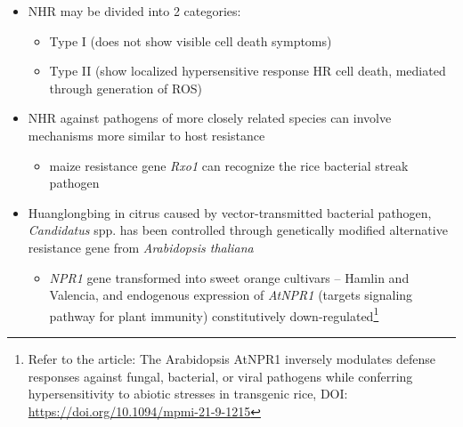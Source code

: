 \documentclass[11pt,dvipsnames,ignorenonframetext,aspectratio=169]{beamer}
\providecommand{\tightlist}{%
  \setlength{\itemsep}{0pt}\setlength{\parskip}{0pt}}
\begin{document}
\begin{frame}{}
\protect\hypertarget{section-14}{}
\small

\begin{itemize}
\tightlist
\item
  NHR may be divided into 2 categories:

  \begin{itemize}
  \footnotesize
  \item Type I (does not show visible cell death symptoms)
  \item Type II (show localized hypersensitive response HR cell death, mediated through generation of ROS)
  \end{itemize}
\item
  NHR against pathogens of more closely related species can involve
  mechanisms more similar to host resistance

  \begin{itemize}
  \footnotesize
  \item maize resistance gene \textit{Rxo1} can recognize the rice bacterial streak pathogen
  \end{itemize}
\item
  Huanglongbing in citrus caused by vector-transmitted bacterial
  pathogen, \emph{Candidatus} spp. has been controlled through
  genetically modified alternative resistance gene from
  \emph{Arabidopsis thaliana}

  \begin{itemize}
  \scriptsize
  \item \textit{NPR1} gene transformed into sweet orange cultivars -- Hamlin and Valencia, and endogenous expression of \textit{AtNPR1} (targets signaling pathway for plant immunity) constitutively down-regulated\footnote[frame]{\scriptsize Refer to the article: The Arabidopsis AtNPR1 inversely modulates defense responses against fungal, bacterial, or viral pathogens while conferring hypersensitivity to abiotic stresses in transgenic rice, DOI: \url{https://doi.org/10.1094/mpmi-21-9-1215}}
  \end{itemize}
\end{itemize}
\end{frame}
\end{document}
